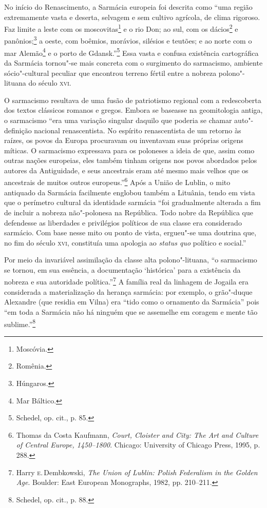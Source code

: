 No início do Renascimento, a Sarmácia europeia foi descrita como ``uma
região extremamente vasta e deserta, selvagem e sem cultivo agrícola, de
clima rigoroso. Faz limite a leste com os moscovitas\footnote{Moscóvia.} e o
rio Don; ao sul, com os dácios\footnote{Romênia.} e panônios;\footnote{Húngaros.} 
a oeste, com boêmios, morávios, silésios e teutões; e ao norte com o mar
Alemão\footnote{Mar Báltico.} e o porto de Gdansk.''\footnote{Schedel, op. cit., p. 85.} Essa vasta e confusa existência cartográfica da Sarmácia tornou"-se mais concreta com o surgimento do sarmacismo, ambiente
sócio"-cultural peculiar que encontrou terreno fértil entre a nobreza
polono"-lituana do século \textsc{xvi}.

O sarmacismo resultava de uma fusão de patriotismo regional com a
redescoberta dos textos clássicos romanos e gregos. Embora se baseasse
na geomitologia antiga, o sarmacismo ``era uma variação singular daquilo
que poderia se chamar auto"-definição nacional renascentista. No espírito
renascentista de um retorno às raízes, os povos da Europa procuravam ou
inventavam suas próprias origens míticas. O sarmacismo expressava para
os poloneses a ideia de que, assim como outras nações europeias, eles
também tinham origens nos povos abordados pelos autores da Antiguidade,
e seus ancestrais eram até mesmo mais velhos que os ancestrais de muitos
outros europeus.''\footnote{Thomas da Costa Kaufmann, \textit{Court, Cloister and City: The Art and Culture of Central Europe, 1450--1800}. Chicago: University of Chicago Press, 1995, p. 288.} Após a União de Lublin, o mito antiquado da Sarmácia facilmente englobou também a
Lituânia, tendo em vista que o perímetro cultural da identidade sarmácia ``foi gradualmente alterada a fim de incluir a nobreza não"-polonesa na
República. Todo nobre da República que defendesse as liberdades e
privilégios políticos de sua classe era considerado sarmácio. Com base
nesse mito ou ponto de vista, ergueu"-se uma doutrina que, no fim do
século \textsc{xvi}, constituía uma apologia ao \textit{status quo} político e
social.''

Por meio da invariável assimilação da classe alta
polono"-lituana, ``o sarmacismo se tornou, em sua essência, a
documentação `histórica' para a existência da nobreza e sua autoridade
política.''\footnote{Harry \textsc{e}.\,Dembkowski, \textit{The Union of Lublin: Polish Federalism in the Golden Age}. Boulder: East European Monographs, 1982, pp. 210--211.} A família real da linhagem de Jogaila era considerada a materialização da herança sarmácia: por exemplo, o
grão"-duque Alexandre (que residia em Vilna) era ``tido como o ornamento
da Sarmácia'' pois ``em toda a Sarmácia não há ninguém que se assemelhe
em coragem e mente tão sublime.''\footnote{Schedel, op. cit., p. 88.}

